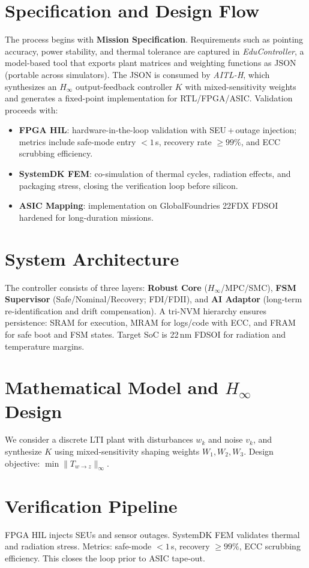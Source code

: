 \documentclass[conference]{IEEEtran}
\begin{document}
\section{Specification and Design Flow}
The process begins with \textbf{Mission Specification}.
Requirements such as pointing accuracy, power stability, and thermal tolerance
are captured in \emph{EduController}, a model-based tool that exports plant
matrices and weighting functions as JSON (portable across simulators).
The JSON is consumed by \emph{AITL-H}, which synthesizes an
$H_\infty$ output-feedback controller \(K\) with mixed-sensitivity weights and
generates a fixed-point implementation for RTL/FPGA/ASIC.
Validation proceeds with:
\begin{itemize}
  \item \textbf{FPGA HIL}: hardware-in-the-loop validation with SEU\,+\,outage
  injection; metrics include safe-mode entry $<\!1$\,s, recovery rate $\ge 99\%$,
  and ECC scrubbing efficiency.
  \item \textbf{SystemDK FEM}: co-simulation of thermal cycles, radiation
  effects, and packaging stress, closing the verification loop before silicon.
  \item \textbf{ASIC Mapping}: implementation on GlobalFoundries 22FDX FDSOI
  hardened for long-duration missions.
\end{itemize}

\section{System Architecture}
The controller consists of three layers:
\textbf{Robust Core} ($H_\infty$/MPC/SMC),
\textbf{FSM Supervisor} (Safe/Nominal/Recovery; FDI/FDII),
and \textbf{AI Adaptor} (long-term re-identification and drift compensation).
A tri-NVM hierarchy ensures persistence: SRAM for execution,
MRAM for logs/code with ECC, and FRAM for safe boot and FSM states.
Target SoC is 22\,nm FDSOI for radiation and temperature margins.

\section{Mathematical Model and $H_\infty$ Design}
We consider a discrete LTI plant with disturbances \(w_k\) and noise \(v_k\),
and synthesize \(K\) using mixed-sensitivity shaping weights \(W_1,W_2,W_3\).
Design objective: \(\min \|T_{w\to z}\|_\infty\).

\section{Verification Pipeline}
FPGA HIL injects SEUs and sensor outages.
SystemDK FEM validates thermal and radiation stress.
Metrics: safe-mode $<\!1$\,s, recovery $\ge 99\%$, ECC scrubbing efficiency.
This closes the loop prior to ASIC tape-out.
\end{document}
